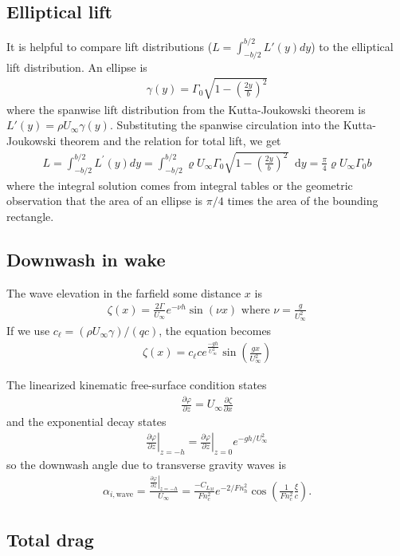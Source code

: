\documentclass[10pt]{article}
\newcommand{\diff}{\mathop{}\!\mathrm{d}} %
\newcommand{\pp}[2]{\frac{\partial #1}{\partial #2}}
\newcommand{\be}{\begin{eqnarray}}
\newcommand{\ee}{\end{eqnarray}}
\newcommand{\Uinf}{U_{\infty}}
\newcommand{\tn}[1]{\textrm{#1}}
\begin{document}
\subsection{Elliptical lift}
It is helpful to compare lift distributions ($L = \int_{-b/2}^{b/2}L'(y) dy$) to the elliptical lift distribution.
An ellipse is
\be
\gamma(y)=\Gamma_0 \sqrt{1-\left(\frac{2 y}{b}\right)^2}
\ee
where the spanwise lift distribution from the Kutta-Joukowski theorem is $L'(y) = \rho \Uinf \gamma(y)$.
Substituting the spanwise circulation into the Kutta-Joukowski theorem and the relation for total lift, we get
\be
L=\int_{-b / 2}^{b / 2} L^{\prime}(y) d y=\int_{-b / 2}^{b / 2} \varrho \Uinf \Gamma_0 \sqrt{1-\left(\frac{2 y}{b}\right)^2} \diff y=\frac{\pi}{4} \varrho \Uinf \Gamma_0 b
\ee
where the integral solution comes from integral tables or the geometric observation that the area of an ellipse is $\pi/4$ times the area of the bounding rectangle.

\subsection{Downwash in wake}
The wave elevation in the farfield some distance $x$ is
\be
\zeta(x) = \frac{2\Gamma}{\Uinf}e^{-\nu h} \sin(\nu x)
\tn{ where }
\nu = \frac{g}{\Uinf^2}
\ee
If we use $c_\ell = (\rho \Uinf \gamma) /\left(q c\right)$, the equation becomes
\be
\zeta(x) = c_\ell c e^{\frac{-gh}{\Uinf^2}} \sin\left(\frac{g x}{\Uinf^2}\right)
\ee

The linearized kinematic free-surface condition states
\be
\label{eqn:KFSBC}
\pp{\varphi}{z} =
\Uinf \pp{\zeta}{x}
\ee
and the exponential decay states
\be
\left. \pp{\varphi}{z} \right|_{z=-h} =
\left. \pp{\varphi}{z} \right|_{z=0} e^{-gh/\Uinf^2}
\ee
so the downwash angle due to transverse gravity waves is
\be
\alpha_{i,\tn{wave}} = \frac{ \left. \pp{\varphi}{z} \right|_{z=-h} }{\Uinf}
=
\frac{
-C_{L_M}
}{Fn_c^2} e^{{-2}/{Fn_h^2}}
\cos\left(
\frac{1}{Fn_c^2}\frac{\xi}{c}
\right).
\ee

\subsection{Total drag}
\end{document}
